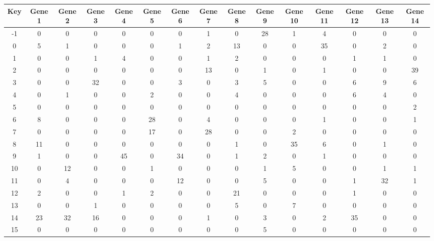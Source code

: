 \begin{tabular}{|c|c|c|c|c|c|c|c|c|c|c|c|c|c|c|}
\hline
Key & Gene 1 & Gene 2 & Gene 3 & Gene 4 & Gene 5 & Gene 6 & Gene 7 & Gene 8 & Gene 9 & Gene 10 & Gene 11 & Gene 12 & Gene 13 & Gene 14 \\
\hline
-1 & 0 & 0 & 0 & 0 & 0 & 0 & 1 & 0 & 28 & 1 & 4 & 0 & 0 & 0 \\
0 & 5 & 1 & 0 & 0 & 0 & 1 & 2 & 13 & 0 & 0 & 35 & 0 & 2 & 0 \\
1 & 0 & 0 & 1 & 4 & 0 & 0 & 1 & 2 & 0 & 0 & 0 & 1 & 1 & 0 \\
2 & 0 & 0 & 0 & 0 & 0 & 0 & 13 & 0 & 1 & 0 & 1 & 0 & 0 & 39 \\
3 & 0 & 0 & 32 & 0 & 0 & 3 & 0 & 3 & 5 & 0 & 0 & 6 & 9 & 6 \\
4 & 0 & 1 & 0 & 0 & 2 & 0 & 0 & 4 & 0 & 0 & 0 & 6 & 4 & 0 \\
5 & 0 & 0 & 0 & 0 & 0 & 0 & 0 & 0 & 0 & 0 & 0 & 0 & 0 & 2 \\
6 & 8 & 0 & 0 & 0 & 28 & 0 & 4 & 0 & 0 & 0 & 1 & 0 & 0 & 1 \\
7 & 0 & 0 & 0 & 0 & 17 & 0 & 28 & 0 & 0 & 2 & 0 & 0 & 0 & 0 \\
8 & 11 & 0 & 0 & 0 & 0 & 0 & 0 & 1 & 0 & 35 & 6 & 0 & 1 & 0 \\
9 & 1 & 0 & 0 & 45 & 0 & 34 & 0 & 1 & 2 & 0 & 1 & 0 & 0 & 0 \\
10 & 0 & 12 & 0 & 0 & 1 & 0 & 0 & 0 & 1 & 5 & 0 & 0 & 1 & 1 \\
11 & 0 & 4 & 0 & 0 & 0 & 12 & 0 & 0 & 5 & 0 & 0 & 1 & 32 & 1 \\
12 & 2 & 0 & 0 & 1 & 2 & 0 & 0 & 21 & 0 & 0 & 0 & 1 & 0 & 0 \\
13 & 0 & 0 & 1 & 0 & 0 & 0 & 0 & 5 & 0 & 7 & 0 & 0 & 0 & 0 \\
14 & 23 & 32 & 16 & 0 & 0 & 0 & 1 & 0 & 3 & 0 & 2 & 35 & 0 & 0 \\
15 & 0 & 0 & 0 & 0 & 0 & 0 & 0 & 0 & 5 & 0 & 0 & 0 & 0 & 0 \\
\hline
\end{tabular}
